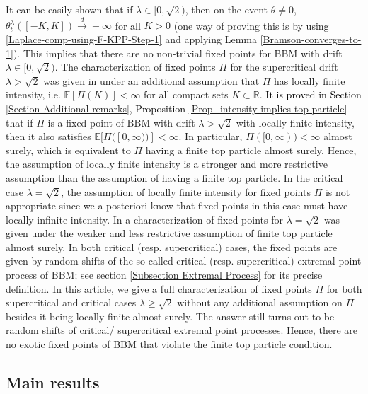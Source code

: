 \documentclass[a4paper,reqno]{amsart}%
\newcommand{\1}{\mathbf 1}
\theoremstyle{mine}
\numberwithin{theorem}{section}
\numberwithin{equation}{section}
\theoremstyle{remark}
\begin{document}
It can be easily shown that if $\lambda \in [0, \sqrt{2})$, then on the event $\theta \neq 0$, $\theta_t^\lambda([-K, K]) \overset{d}{\to} +\infty$ for all $K>0$ (one way of proving this is by using \eqref{Laplace-comp-using-F-KPP-Step-1} and applying Lemma \ref{Bramson-converges-to-1}). This implies that there are no non-trivial fixed points for BBM with drift $\lambda \in [0, \sqrt{2})$. The characterization of fixed points $\Pi$ for the supercritical drift $\lambda > \sqrt{2}$ was given in \cite{Kabluchko} under an additional assumption that $\Pi$ has locally finite intensity, i.e. $\mathbb{E}[\Pi(K)] < \infty$ for all compact sets $K \subset \mathbb{R}$.
\textcolor{black}{It is proved in Section \ref{Section Additional remarks}, Proposition \ref{Prop_intensity implies top particle}} that if $\Pi$ is a fixed point of BBM with drift $\lambda >\sqrt{2}$ with locally finite intensity, then it also satisfies $\mathbb{E}[\Pi([0,\infty))] < \infty$.
In particular, $\Pi([0,\infty)) <\infty$ almost surely, which is equivalent to $\Pi$ having a finite top particle almost surely. Hence, the assumption of locally finite intensity is a stronger and more restrictive assumption than the assumption of having a finite top particle. In the critical case $\lambda = \sqrt{2}$, the assumption of locally finite intensity for fixed points $\Pi$ is not appropriate since we a posteriori know that fixed points in this case must have locally infinite intensity. In \cite{Shekhar_FP} a characterization of fixed points for $\lambda = \sqrt{2}$ was given under the weaker and less restrictive assumption of finite top particle almost surely. In both critical (resp. supercritical) cases, the fixed points are given by random shifts of the so-called critical (resp. supercritical) extremal point process of BBM; see section \ref{Subsection Extremal Process} for its precise definition. 
In this article, we give a full characterization of fixed points $\Pi$ for both supercritical and critical cases $\lambda \geq \sqrt{2}$ without any additional assumption on $\Pi$ besides it being locally finite almost surely. The answer still turns out to be random shifts of critical/ supercritical extremal point processes. Hence, there are no exotic fixed points of BBM that violate the finite top particle condition. \\

\subsection{Main results} \label{main-results-subsection}
\end{document}

